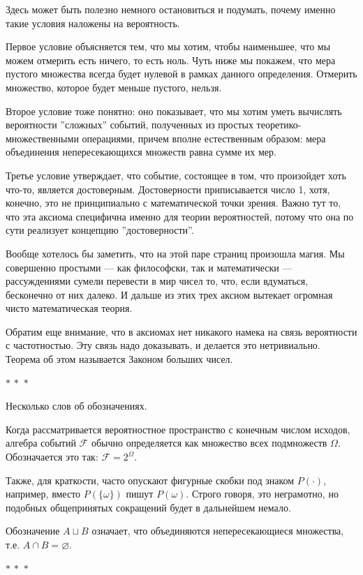 \documentclass[a4paper,12pt]{article}
\newcommand{\threestars}{\begin{center}$ {\ast}\,{\ast}\,{\ast} $\end{center}}
\newcounter{th-counter}
\begin{document}
Здесь может быть полезно немного остановиться и подумать, почему именно такие условия наложены на вероятность.

Первое условие объясняется тем, что мы хотим, чтобы наименьшее, что мы можем отмерить есть ничего, то есть ноль. Чуть ниже мы покажем, что мера пустого множества всегда будет нулевой в рамках данного определения. Отмерить множество, которое будет меньше пустого, нельзя.

Второе условие тоже понятно: оно показывает, что мы хотим уметь вычислять вероятности ''сложных'' событий, полученных из простых теоретико-множественными операциями, причем вполне естественным образом: мера объединения непересекающихся множеств равна сумме их мер.

Третье условие утверждает, что событие, состоящее в том, что произойдет хоть что-то, является достоверным. Достоверности приписывается число 1, хотя, конечно, это не принципиально с математической точки зрения. Важно тут то, что эта аксиома специфична именно для теории вероятностей, потому что она по сути реализует концепцию ''достоверности''.

Вообще хотелось бы заметить, что на этой паре страниц произошла магия. Мы совершенно простыми --- как философски, так и математически --- рассуждениями сумели перевести в мир чисел то, что, если вдуматься, бесконечно от них далеко. И дальше из этих трех аксиом вытекает огромная чисто математическая теория.

Обратим еще внимание, что в аксиомах нет никакого намека на связь вероятности с частотностью. Эту связь надо доказывать, и делается это нетривиально. Теорема об этом называется Законом больших чисел.

\threestars
Несколько слов об обозначениях.

Когда рассматривается вероятностное пространство с конечным числом исходов, алгебра событий $\mathcal{F}$ обычно определяется как множество всех подмножеств $\Omega$. Обозначается это так: $\mathcal{F} = 2^\Omega$.

Также, для краткости, часто опускают фигурные скобки под знаком $P(\cdot)$, например, вместо $P(\{\omega\})$ пишут $P(\omega)$. Строго говоря, это неграмотно, но подобных общепринятых сокращений будет в дальнейшем немало.

Обозначение $A \sqcup B$ означает, что объединяются непересекающиеся множества, т.е. $A \cap B = \varnothing$.

\threestars
\end{document}
